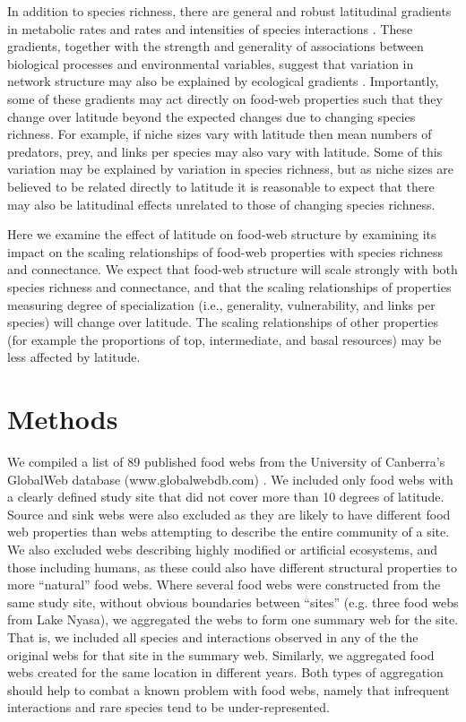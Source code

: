 \documentclass[12pt]{article}
\begin{document}
In addition to species richness, there are general and robust latitudinal gradients in metabolic rates \citep{Stegen2012} and 
rates and intensities of species interactions \citep{Marquis2005,Schemske2009}. These gradients, together with the strength and 
generality of associations between biological processes and environmental variables, suggest that variation in network structure 
may also be explained by ecological gradients \citep{Baiser2011}. Importantly, some of these gradients may act directly 
on food-web properties such that they change over latitude beyond the expected changes due to changing species richness. For 
example, if niche sizes vary with latitude then mean numbers of predators, prey, and links per species may also vary with 
latitude. Some of this variation may be explained by variation in species richness, but as niche sizes are believed to be 
related directly to latitude it is reasonable to expect that there may also be latitudinal effects unrelated to those of 
changing species richness.


Here we examine the effect of latitude on food-web structure by examining
its impact on the scaling relationships of food-web properties with species
richness and connectance. We expect that food-web structure will scale strongly
with both species richness and connectance, and that the scaling relationships
of properties measuring degree of specialization (i.e., generality, vulnerability, and
links per species) will change over latitude. The scaling relationships of other
properties (for example the proportions of top, intermediate, and basal resources) may
be less affected by latitude.


\section*{Methods}

We compiled a list of 89 published food webs from the University of Canberra's GlobalWeb database (www.globalwebdb.com) \citep{}. We
included only food webs with a clearly defined study site that did not cover
more than 10 degrees of latitude. Source and sink webs were also excluded as
they are likely to have different food web properties than webs attempting to
describe the entire community of a site. We also excluded webs describing highly
modified or artificial ecosystems, and those including humans, as these could also
have different structural properties to more ``natural'' food webs.
Where several food webs were constructed from the same study site, without obvious boundaries between ``sites'' (e.g. three food
webs from Lake Nyasa), we aggregated the webs to form one summary web for the site. That is, we included all species and
interactions observed in any of the the original webs for that site in the summary web.
Similarly, we aggregated food webs created for the same location in different years. Both types of
aggregation should help to combat a known problem with food webs, namely that infrequent interactions and
rare species tend to be under-represented.
\end{document}
